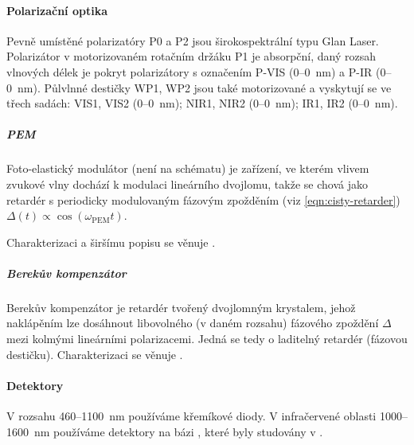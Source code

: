 \paragraph{Polarizační optika}
Pevně umístěné polarizatóry P0 a P2 jsou širokospektrální typu Glan Laser.
Polarizátor v motorizovaném rotačním držáku P1 je absorpční, daný rozsah vlnových délek je pokryt polarizátory s označením P-VIS (\num{0}--\SI{0}{\nano\meter}) a P-IR (\num{0}--\SI{0}{\nano\meter}).
Půlvlnné destičky WP1, WP2 jsou také motorizované a vyskytují se ve třech sadách: VIS1, VIS2 (\num{0}--\SI{0}{\nano\meter}); NIR1, NIR2 (\num{0}--\SI{0}{\nano\meter}); IR1, IR2 (\num{0}--\SI{0}{\nano\meter}).

\subparagraph{PEM}
Foto-elastický modulátor (není na schématu) je zařízení, ve kterém vlivem zvukové vlny dochází k modulaci lineárního dvojlomu,
takže se chová jako retardér s periodicky modulovaným fázovým zpožděním (viz \eqref{eqn:cisty-retarder}) $\Delta(t) \propto \cos(\omega_\textrm{PEM}t)$. 

Charakterizaci a širšímu popisu se věnuje \cite{minarModulacePolarizaceSvetelne2004}.

\subparagraph{Berekův kompenzátor}
Berekův kompenzátor je retardér tvořený dvojlomným krystalem, jehož naklápěním lze dosáhnout libovolného (v daném rozsahu) fázového zpoždění $\Delta$ mezi kolmými lineárními polarizacemi.
Jedná se tedy o laditelný retardér (fázovou destičku).
Charakterizaci se věnuje \cite{schusserSkryteKouzloPolarizace2014}.

\paragraph{Detektory}
V rozsahu \num{460}--\SI{1100}{\nano\meter} používáme křemíkové diody.
V infračervené oblasti \num{1000}--\SI{1600}{\nano\meter} používáme detektory na bázi , které byly studovány v \cite{hovorakovaCharakterizaceInfracervenehoDetektoru}.
